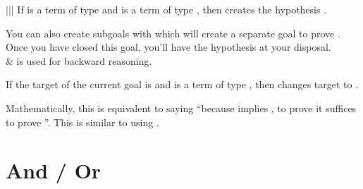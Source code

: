 \documentclass[letterpaper,10pt,english]{sphinxmanual}
\begin{document}
\begin{savenotes}
\begin{tabular}[t]{|||}
\sphinxAtStartPar
If  is a term of type  and
 is a term of type , then
 creates the hypothesis  .

\sphinxAtStartPar
You can also create subgoals with  which will create a separate goal to prove .
Once you have closed this goal, you’ll have the hypothesis  at your disposal.
\\
\hline
\sphinxAtStartPar
{}
&
\sphinxAtStartPar
{} is used for backward reasoning.

\sphinxAtStartPar
If the target of the current goal is  and
 is a term of type , then
 changes target to .

\sphinxAtStartPar
Mathematically, this is equivalent to saying “because  implies , to prove  it suffices to prove ”.
This is similar to using .
\\
\hline
\end{tabular}
\par
\sphinxattableend\end{savenotes}


\section{And / Or}
\label{\detokenize{tactics:and-or}}
\end{document}
